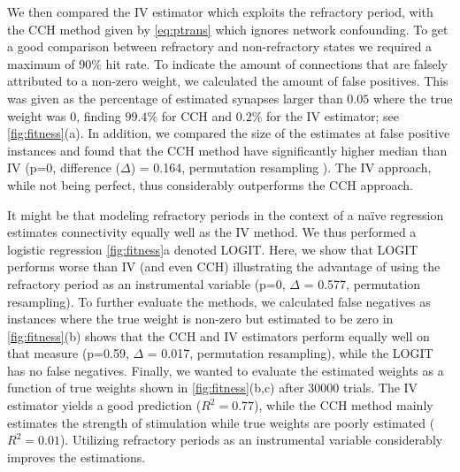 \documentclass[11pt]{article}
\begin{document}
We then compared the IV estimator which exploits the refractory period, with the CCH method given by \cref{eq:ptrans} which ignores network confounding. 
To get a good comparison between refractory and non-refractory states we required a maximum of 90$\%$ hit rate. 
To indicate the amount of connections that are falsely attributed to a non-zero weight, we calculated the amount of false positives. 
This was given as the percentage of estimated synapses larger than $ 0.05 $ where the true weight was $ 0 $, finding $ 99.4\% $ for CCH and $ 0.2\% $ for the IV estimator; see \cref{fig:fitness}(a). 
In addition, we compared the size of the estimates at false positive instances and found that the CCH method have significantly higher median than IV (p=0, difference ($\Delta$) = 0.164, permutation resampling \citep{wassermann2006all}). 
The IV approach, while not being perfect, thus considerably outperforms the CCH approach.

It might be that modeling refractory periods in the context of a na\"ive regression estimates connectivity equally well as the IV method. 
We thus performed a logistic regression \cref{fig:fitness}a denoted LOGIT. 
Here, we show that LOGIT performs worse than IV (and even CCH)
illustrating the advantage of using the refractory period as an instrumental variable (p=0, $\Delta$ = 0.577, permutation resampling). 
To further evaluate the methods, we calculated false negatives as instances where the true weight is non-zero but estimated to be zero in \cref{fig:fitness}(b) shows that the CCH and IV estimators perform equally well on that measure (p=0.59, $\Delta$ = 0.017, permutation resampling), while the LOGIT has no false negatives. 
Finally, we wanted to evaluate the estimated weights as a function of true weights shown in \cref{fig:fitness}(b,c) after 30000 trials. 
The IV estimator yields a good prediction ($ R^2 = 0.77 $), while the CCH method mainly estimates the strength of stimulation while true weights are poorly estimated ($ R^2 = 0.01 $). Utilizing refractory periods as an instrumental variable considerably improves the estimations.
\end{document}
